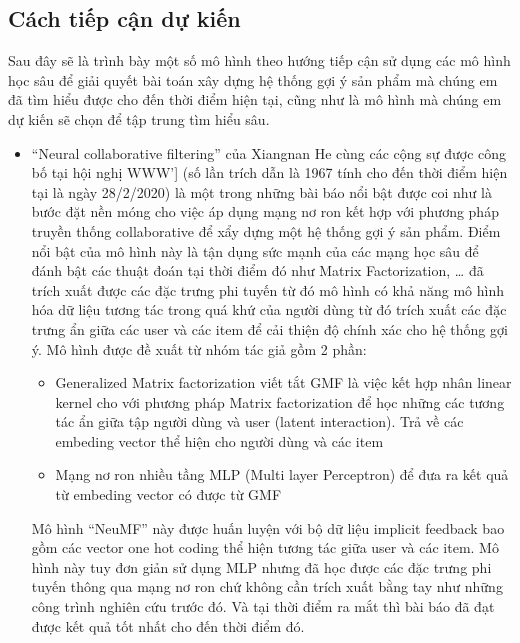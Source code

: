 \documentclass{article}[14pt]
\begin{document}
{    \subsection{Cách tiếp cận dự kiến}
    
    Sau đây sẽ là trình bày một số mô hình theo hướng tiếp cận sử dụng các mô hình học sâu để giải quyết bài toán xây dựng hệ thống gợi ý sản phẩm mà chúng em đã tìm hiểu được cho đến thời điểm hiện tại, cũng như là mô hình mà chúng em dự kiến sẽ chọn để tập trung tìm hiểu sâu. 
    
    
\begin{itemize}
\item  	“Neural collaborative filtering” của Xiangnan He cùng các cộng sự được công bố tại hội nghị WWW’] \cite{neumf} (số lần trích dẫn là 1967 tính cho đến thời điểm hiện tại là ngày 28/2/2020) là một trong những bài báo nổi bật được coi như là bước đặt nền móng cho việc áp dụng mạng nơ ron kết hợp với phương pháp truyền thống collaborative để xẩy dựng một hệ thống gợi ý sản phẩm.
Điểm nổi bật của mô hình này là tận dụng sức mạnh của các mạng học sâu để đánh bật các thuật đoán tại thời điểm đó như Matrix Factorization, …  đã trích xuất được các đặc trưng phi tuyến từ đó mô hình có khả năng mô hình hóa dữ liệu tương tác trong quá khứ của người dùng từ đó trích xuất các đặc trưng ẩn giữa các user và các item để cải thiện độ chính xác cho hệ thống gợi ý.
Mô hình được đề xuất từ nhóm tác giả gồm 2 phần: 
\begin{itemize}
    \item  Generalized Matrix factorization viết tắt GMF là việc kết hợp nhân linear kernel cho với phương pháp Matrix factorization để học những các tương tác ẩn giữa tập người dùng và user (latent interaction).
    Trả về các embeding vector thể hiện cho người dùng và các item
    \item 	Mạng nơ ron nhiều tầng MLP (Multi layer Perceptron) để đưa ra 	kết quả từ embeding vector có được từ GMF
\end{itemize}
Mô hình “NeuMF” này được huấn luyện với bộ dữ liệu implicit feedback bao gồm các vector one hot coding thể hiện tương tác giữa user và các item.
Mô hình này tuy đơn giản sử dụng MLP nhưng đã học được các đặc trưng phi tuyến thông qua mạng nơ ron chứ không cần trích xuất bằng tay như những công trình nghiên cứu trước đó. 
Và tại thời điểm ra mắt thì bài báo đã đạt được kết quả tốt nhất cho đến thời điểm đó.


\end{itemize}}
\end{document}
